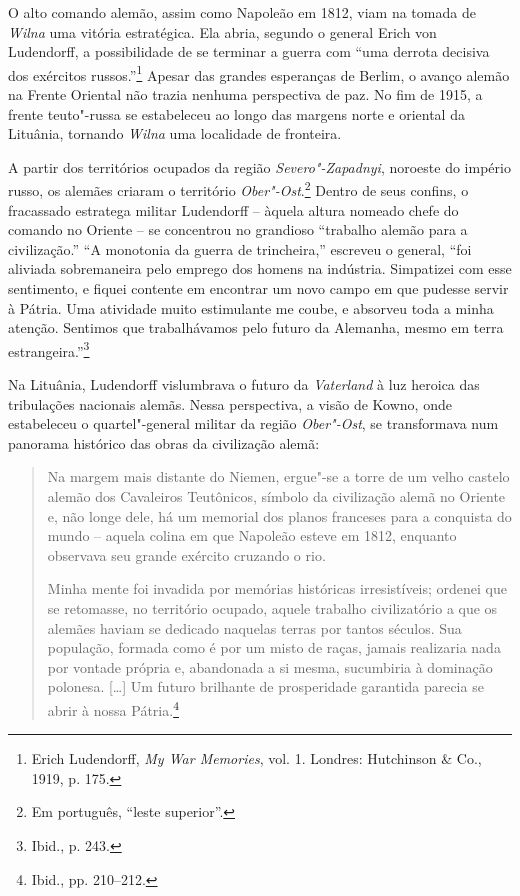 O alto comando alemão, assim como Napoleão em 1812, viam na tomada de
\textit{Wilna} uma vitória estratégica. Ela abria, segundo o general Erich von
Ludendorff, a possibilidade de se terminar a guerra com ``uma derrota
decisiva dos exércitos russos.''\footnote{Erich Ludendorff, \textit{My War Memories}, vol. 1. Londres: Hutchinson \& Co., 1919, p. 175.} Apesar das grandes esperanças de Berlim, o avanço alemão na Frente Oriental não
trazia nenhuma perspectiva de paz. No fim de 1915, a frente teuto"-russa
se estabeleceu ao longo das margens norte e oriental da Lituânia,
tornando \textit{Wilna} uma localidade de fronteira.

A partir dos territórios ocupados da região \textit{Severo"-Zapadnyi}, noroeste do império russo, os alemães criaram o território
\textit{Ober"-Ost}.\footnote{Em português, ``leste superior''.} Dentro de seus confins, o fracassado
estratega militar Ludendorff -- àquela altura nomeado chefe do comando no
Oriente -- se concentrou no grandioso ``trabalho alemão para a
civilização.'' ``A monotonia da guerra de trincheira,'' escreveu o
general, ``foi aliviada sobremaneira pelo emprego dos homens na
indústria. Simpatizei com esse sentimento, e fiquei contente em
encontrar um novo campo em que pudesse servir à Pátria. Uma atividade
muito estimulante me coube, e absorveu toda a minha atenção. Sentimos
que trabalhávamos pelo futuro da Alemanha, mesmo em terra
estrangeira.''\footnote{Ibid., p. 243.}

Na Lituânia, Ludendorff vislumbrava o futuro da \textit{Vaterland} à luz
heroica das tribulações nacionais alemãs. Nessa perspectiva, a visão de
Kowno, onde estabeleceu o quartel"-general militar da região
\textit{Ober"-Ost}, se transformava num panorama histórico das obras da
civilização alemã:

\begin{quote}
Na margem mais distante do Niemen, ergue"-se a torre de um velho castelo
alemão dos Cavaleiros Teutônicos, símbolo da civilização alemã no
Oriente e, não longe dele, há um memorial dos planos franceses para a
conquista do mundo -- aquela colina em que Napoleão esteve em 1812,
enquanto observava seu grande exército cruzando o rio.

Minha mente foi invadida por memórias históricas irresistíveis; ordenei
que se retomasse, no território ocupado, aquele trabalho civilizatório a
que os alemães haviam se dedicado naquelas terras por tantos séculos.
Sua população, formada como é por um misto de raças, jamais realizaria
nada por vontade própria e, abandonada a si mesma, sucumbiria à
dominação polonesa. [\ldots{}] Um futuro brilhante de prosperidade
garantida parecia se abrir à nossa Pátria.\footnote{Ibid., pp. 210--212.}
\end{quote}

